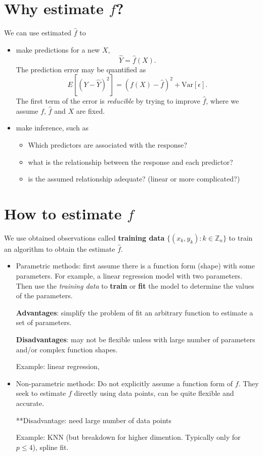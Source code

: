 \documentclass[
  letterpaper,
  DIV=11,
  numbers=noendperiod]{scrreprt}
\providecommand{\tightlist}{%
  \setlength{\itemsep}{0pt}\setlength{\parskip}{0pt}}\usepackage{longtable,booktabs,array}
\begin{document}
\section{\texorpdfstring{Why estimate
\(f\)?}{Why estimate f?}}\label{why-estimate-f}

We can use estimated \(\hat{f}\) to

\begin{itemize}
\tightlist
\item
  make predictions for a new \(X\), \[\hat{Y} =\hat{f}(X). \] The
  prediction error may be quantified as
  \[E[(Y-\hat{Y})^2] = (f(X)-\hat{f})^2 +\text{Var}[\epsilon].\] The
  first term of the error is \emph{reducible} by trying to improve
  \(\hat{f}\), where we assume \(f\), \(\hat{f}\) and \(X\) are fixed.
\item
  make inference, such as

  \begin{itemize}
  \tightlist
  \item
    Which predictors are associated with the response?
  \item
    what is the relationship between the response and each predictor?
  \item
    is the assumed relationship adequate? (linear or more complicated?)
  \end{itemize}
\end{itemize}

\section{\texorpdfstring{How to estimate
\(f\)}{How to estimate f}}\label{how-to-estimate-f}

We use obtained observations called \textbf{training data}
\(\{(x_k, y_k): k \in \mathbb{Z}_n \}\) to train an algorithm to obtain
the estimate \(\hat{f}\).

\begin{itemize}
\item
  Parametric methods: first assume there is a function form (shape) with
  some parameters. For example, a linear regression model with two
  parameters. Then use the \emph{training data} to \textbf{train} or
  \textbf{fit} the model to determine the values of the parameters.

  \textbf{Advantages}: simplify the problem of fit an arbitrary function
  to estimate a set of parameters.

  \textbf{Disadvantages}: may not be flexible unless with large number
  of parameters and/or complex function shapes.

  Example: linear regression,
\item
  Non-parametric methods: Do not explicitly assume a function form of
  \(f\). They seek to estimate \(f\) directly using data points, can be
  quite flexible and accurate.

  **Disadvantage: need large number of data points

  Example: KNN (but breakdown for higher dimention. Typically only for
  \(p\le 4\)), spline fit.
\end{itemize}
\end{document}
